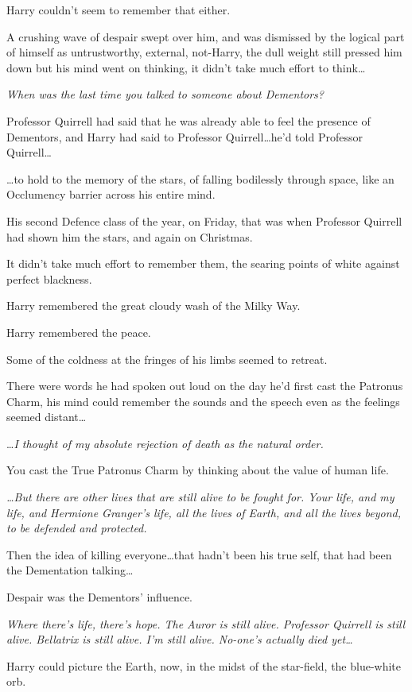 Harry couldn’t seem to remember that either.

A crushing wave of despair swept over him, and was dismissed by the logical part of himself as untrustworthy, external, not-Harry, the dull weight still pressed him down but his mind went on thinking, it didn’t take much effort to think…

\emph{When was the last time you talked to someone about Dementors?}

Professor Quirrell had said that he was already able to feel the presence of Dementors, and Harry had said to Professor Quirrell…he’d told Professor Quirrell…

…to hold to the memory of the stars, of falling bodilessly through space, like an Occlumency barrier across his entire mind.

His second Defence class of the year, on Friday, that was when Professor Quirrell had shown him the stars, and again on Christmas.

It didn’t take much effort to remember them, the searing points of white against perfect blackness.

Harry remembered the great cloudy wash of the Milky Way.

Harry remembered the peace.

Some of the coldness at the fringes of his limbs seemed to retreat.

There were words he had spoken out loud on the day he’d first cast the Patronus Charm, his mind could remember the sounds and the speech even as the feelings seemed distant…

…\emph{I thought of my absolute rejection of death as the natural order.}

You cast the True Patronus Charm by thinking about the value of human life.

\emph{…But there are other lives that are still alive to be fought for. Your life, and my life, and Hermione Granger’s life, all the lives of Earth, and all the lives beyond, to be defended and protected.}

Then the idea of killing everyone…that hadn’t been his true self, that had been the Dementation talking…

Despair was the Dementors’ influence.

\emph{Where there’s life, there’s hope. The Auror is still alive. Professor Quirrell is still alive. Bellatrix is still alive. I’m still alive. No-one’s actually died yet…}

Harry could picture the Earth, now, in the midst of the star-field, the blue-white orb.

